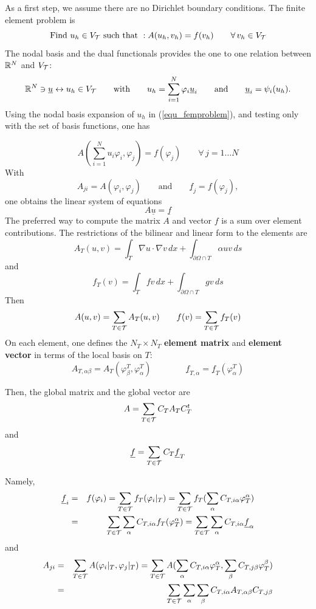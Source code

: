 As a first step, we assume there are no Dirichlet boundary conditions.
The finite element problem is
\begin{equation}
\label{equ_femproblem}
\mbox{Find } u_h \in V_{\cal T} \mbox{ such that } : A (u_h, v_h) = f(v_h) \qquad \forall \, v_h \in V_{\cal T}
\end{equation}
The nodal basis and the dual functionals provides the one to one relation 
between ${\mathbb R}^N$ and $V_{\cal T}$:
$$
{\mathbb R}^N \ni \underline u \leftrightarrow u_h \in V_{\cal T} \qquad \mbox{with} \qquad 
u_h = \sum_{i=1}^N \varphi_i \underline u_i \qquad \mbox{and} \qquad
\underline u_i = \psi_i (u_h).
$$
Using the nodal basis expansion of $u_h$ in (\ref{equ_femproblem}), and
testing only with the set of basis functions, one has

$$
A( \sum_{i=1}^N u_i \varphi_i, \varphi_j) = f(\varphi_j) \qquad \forall \, j = 1 \ldots N
$$
With
$$
A_{ji} = A(\varphi_i, \varphi_j) \qquad \mbox{and} \qquad \underline f_j = f(\varphi_j),
$$
one obtains the linear system of equations
$$
A \underline u = \underline f
$$
The preferred way to compute the matrix $A$ and vector $f$ is a sum over element 
contributions. The restrictions of the bilinear and linear form to the elements are
$$
A_T(u,v) = \int_T \nabla u \cdot \nabla v \, dx + 
        \int_{\partial \Omega \cap T} \alpha u v \, ds
$$
and
$$
f_T(v) = \int_T f v \, dx + 
        \int_{\partial \Omega \cap T} g v \, ds
$$
Then 
$$
A(u,v) = \sum_{T \in \cal T} A_T(u,v)  \qquad
f(v) = \sum_{T \in \cal T} f_T(v)
$$
On each element, one defines the $N_T \times N_T$ {\bf element matrix}  and 
{\bf element vector} in terms of the local basis on $T$:
$$
A_{T,\alpha \beta} = A_T (\varphi^T_\beta, \varphi^T_\alpha)
\qquad \qquad
\underline{f}_{T,\alpha} = \underline{f}_T (\varphi^T_\alpha)
$$

Then, the global matrix and the global vector are
$$
A = \sum_{T \in \cal T} C_T A_T C_T^t
$$
and
$$
\underline f = \sum_{T \in \cal T} C_T \underline f_T
$$


Namely,
\begin{eqnarray*}
\underline f_i & = & f(\varphi_i) = \sum_{T \in \cal T} f_T (\varphi_i|_T) = 
\sum_{T \in \cal T} f_T (\sum_\alpha C_{T,i\alpha} \varphi_T^\alpha) \\
& = &
\sum_{T \in \cal T} \sum_{\alpha} C_{T,i\alpha} f_T (\varphi_T^\alpha) =
\sum_{T \in \cal T}  \sum_{\alpha} C_{T,i\alpha} \underline f_\alpha
\end{eqnarray*}
and
\begin{eqnarray*}
A_{ji} & = & \sum_{T \in \cal T} A(\varphi_i|_T, \varphi_j|_T) = 
         \sum_{T \in \cal T} A (\sum_\alpha C_{T,i\alpha} \varphi_T^\alpha,
                                      \sum_\beta C_{T,j\beta} \varphi_T^\beta) \\
        & = & \sum_{T \in \cal T} \sum_\alpha \sum_\beta C_{T,i\alpha} A_{T,\alpha \beta} C_{T,j\beta}
\end{eqnarray*}


